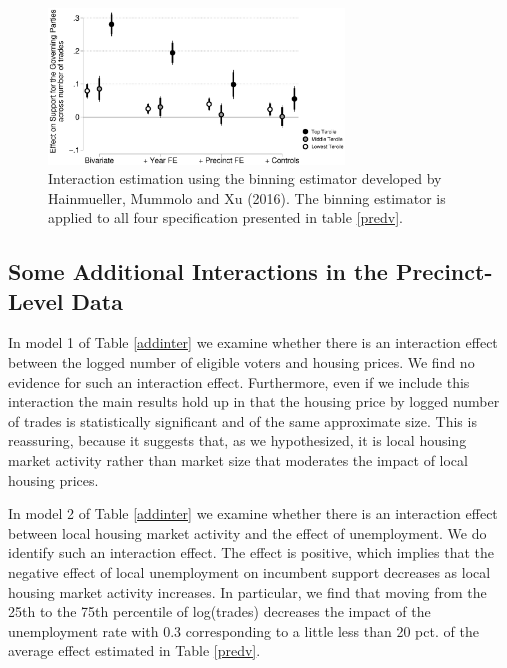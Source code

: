 \documentclass[12pt,a4paper]{article}
\begin{document}
			
			\begin{figure}
				\includegraphics[width=0.7\textwidth]{../figures/localactivity_sup.eps}
				
				\caption{Interaction estimation using the binning estimator developed by Hainmueller, Mummolo and Xu (2016). The binning estimator is applied to all four specification presented in table \ref{predv}. }
				\label{terciles}
			\end{figure}
			
			\newpage
			
			\subsection{Some Additional Interactions in the Precinct-Level Data} \label{add_interaction}
				\setcounter{table}{0}
			\setcounter{figure}{0}
			
			In model 1 of Table \ref{addinter} we examine whether there is an interaction effect between the logged number of eligible voters and housing prices. We find no evidence for such an interaction effect. Furthermore, even if we include this interaction the main results hold up in that the housing price by logged number of trades is statistically significant and of the same approximate size. This is reassuring, because it suggests that, as we hypothesized, it is local housing market activity rather than market size that moderates the impact of local housing prices.
			
			In model 2 of Table \ref{addinter} we examine whether there is an interaction effect between local housing market activity and the effect of unemployment. We do identify such an interaction effect. The effect is positive, which implies that the negative effect of local unemployment on incumbent support decreases as local housing market activity increases. In particular, we find that moving from the 25th to the 75th percentile of log(trades) decreases the impact of the unemployment rate with 0.3 corresponding to a little less than 20 pct. of the average effect estimated in Table \ref{predv}.
			
						
\end{document}
